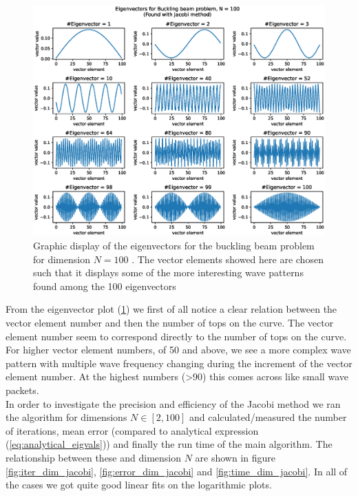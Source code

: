 \documentclass[american,a4paper,12pt]{article}
\begin{document}
\begin{figure}[H]
    \centering
    \includegraphics[width = \textwidth]{figures/eigvecs_buckling_jacobi.eps}
    \caption{Graphic display of the eigenvectors for the buckling beam problem for dimension $N = 100$ . The vector elements showed here are chosen such that it displays some of the more interesting wave patterns found among the 100 eigenvectors}
    \label{fig:eigvecs_buckling_jacobi}
\end{figure}
From the eigenvector plot (\ref{fig:eigvecs_buckling_jacobi}) we first of all notice a clear relation between the vector element number and then the number of tops on the curve. The vector element number seem to correspond directly to the number of tops on the curve. For higher vector element numbers, of 50 and above, we see a more complex wave pattern with multiple wave frequency changing during the increment of the vector element number. At the highest numbers (>90) this comes across like small wave packets. \\
In order to investigate the precision and efficiency of the Jacobi method we ran the algorithm for dimensions $N \in [2, 100]$ and calculated/measured the number of iterations, mean error (compared to analytical expression (\ref{eq:analytical_eigvals})) and finally the run time of the main algorithm. The relationship between these and dimension $N$ are shown in figure \ref{fig:iter_dim_jacobi}, \ref{fig:error_dim_jacobi} and \ref{fig:time_dim_jacobi}. In all of the cases we got quite good linear fits on the logarithmic plots.
\end{document}
